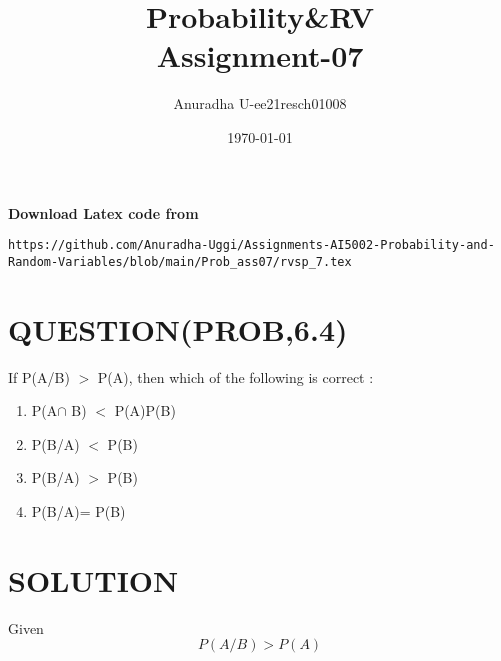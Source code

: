 \documentclass[journal,12pt,twocolumn]{IEEEtran}
\title{Probability\&RV \\ Assignment-07}
\author{Anuradha U-ee21resch01008}
\date{\today}
\begin{document}
\maketitle
\newpage
\bigskip
\renewcommand{\thefigure}{\theenumi}
\renewcommand{\thetable}{\theenumi}
\renewcommand{\theenumi}{\Alph{enumi}}

\textbf{Download Latex code from}
\begin{lstlisting}
https://github.com/Anuradha-Uggi/Assignments-AI5002-Probability-and-Random-Variables/blob/main/Prob_ass07/rvsp_7.tex
\end{lstlisting}
\section{\textbf{QUESTION(PROB,6.4)}}
If P(A/B) $>$ P(A), then which of the following
is correct : 

\begin{enumerate}
    \item P(A$\cap$ B) $<$ P(A)P(B)
    \item P(B/A) $<$ P(B)
    \item P(B/A) $>$ P(B)
    \item P(B/A)= P(B)
\end{enumerate}

\section{\textbf{SOLUTION}}
Given
\begin{equation}
    P(A/B)>P(A)
\end{equation}
\end{document}
